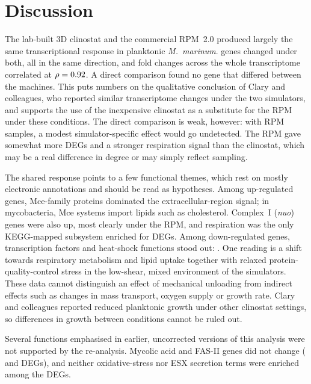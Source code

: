 \section*{Discussion}

The lab-built 3D clinostat and the commercial RPM~2.0 produced largely the same transcriptional response in planktonic \textit{M.~marinum}. \nDegShared{} genes changed under both, all in the same direction, and fold changes across the whole transcriptome correlated at $\rho=0.92$. A direct comparison found no gene that differed between the machines. This puts numbers on the qualitative conclusion of Clary and colleagues, who reported similar transcriptome changes under the two simulators\cite{clary2022development}, and supports the use of the inexpensive clinostat as a substitute for the RPM under these conditions. The direct comparison is weak, however: with \nRpm{} RPM samples, a modest simulator-specific effect would go undetected. The RPM gave somewhat more DEGs and a stronger respiration signal than the clinostat, which may be a real difference in degree or may simply reflect sampling.

The shared response points to a few functional themes, which rest on mostly electronic annotations and should be read as hypotheses. Among up-regulated genes, Mce-family proteins dominated the extracellular-region signal; in mycobacteria, Mce systems import lipids such as cholesterol\cite{pandey2008mycobacterial}. Complex~I (\textit{nuo}) genes were also up, most clearly under the RPM, and respiration was the only KEGG-mapped subsystem enriched for DEGs. Among down-regulated genes, transcription factors and heat-shock functions stood out: \goGenesHeatSharedDown. One reading is a shift towards respiratory metabolism and lipid uptake together with relaxed protein-quality-control stress in the low-shear, mixed environment of the simulators. These data cannot distinguish an effect of mechanical unloading from indirect effects such as changes in mass transport, oxygen supply or growth rate. Clary and colleagues reported reduced planktonic growth under other clinostat settings\cite{clary2022development}, so differences in growth between conditions cannot be ruled out.

Several functions emphasised in earlier, uncorrected versions of this analysis were not supported by the re-analysis. Mycolic acid and FAS-II genes did not change (\mycolicDegClino{} and \mycolicDegRpm{} DEGs), and neither oxidative-stress nor ESX secretion terms were enriched among the DEGs.

